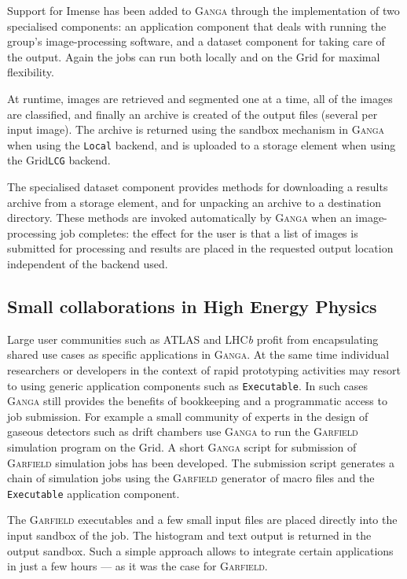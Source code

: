 \documentclass{elsart}
\def\lhcb {LHC{\em b\/}\xspace}
\def\atlas {ATLAS\xspace}
\def\ganga {\textsc{Ganga}\xspace}
\def\garfield {\textsc{Garfield}\xspace}
\def\grid {Grid\xspace}
\newcommand{\code}[1]{\texttt{#1}}
\begin{document}
Support for Imense has been added to \ganga through the implementation of two
specialised components: an application component that deals with running the
group's image-processing software, and a dataset component for taking care of
the output. Again the jobs can run both locally and on the \grid for maximal
flexibility.

At runtime, images are retrieved and segmented one at a time, all of the
images are classified, and finally an archive is created of the output files
(several per input image).  The archive is returned using the sandbox
mechanism in \ganga when using the \code{Local} backend, and is uploaded to a
storage element when using the \grid \code{LCG} backend.

The specialised dataset component provides methods for downloading a results
archive from a storage element, and for unpacking an archive to a destination
directory. These methods are invoked automatically by \ganga when an
image-processing job completes: the effect for the user is that a list of
images is submitted for processing and results are placed in the requested
output location independent of the backend used.

\subsection{Small collaborations in High Energy Physics}
\label{sec:smallHEP}
Large user communities such as \atlas and \lhcb profit from encapsulating
shared use cases as specific applications in \ganga. At the same time
individual researchers or developers in the context of rapid prototyping
activities may resort to using generic application components such as
\code{Executable}. In such cases \ganga still provides the benefits of
bookkeeping and a programmatic access to job submission. For example a small
community of experts in the design of gaseous detectors such as drift chambers
use \ganga to run the \garfield~\cite{Garfield} simulation program on the
\grid.  A short \ganga script for submission of \garfield simulation jobs has
been developed. The submission script generates a chain of simulation jobs
using the \garfield generator of macro files and the \code{Executable}
application component.

The \garfield executables and a few small input files are placed directly into
the input sandbox of the job. The histogram and text output is returned in the
output sandbox. Such a simple approach allows to integrate certain
applications in just a few hours --- as it was the case for \garfield.
\end{document}
